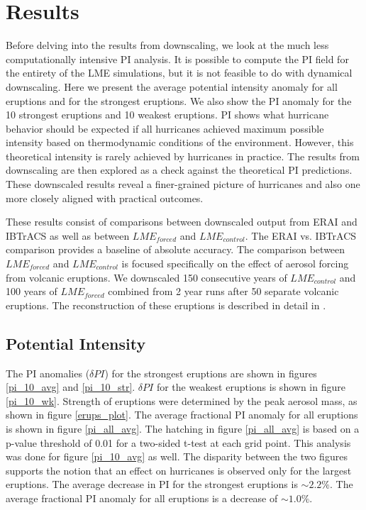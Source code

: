 \documentclass[smallextended]{svjour3}       %
\begin{document}
\section{Results}
\label{results}
Before delving into the results from downscaling, we look at the much less computationally intensive PI analysis. It is possible to compute the PI field for the entirety of the LME simulations, but it is not feasible to do with dynamical downscaling. Here we present the average potential intensity anomaly for all eruptions and for the strongest eruptions. We also show the PI anomaly for the 10 strongest eruptions and 10 weakest eruptions. PI shows what hurricane behavior should be expected if all hurricanes achieved maximum possible intensity based on thermodynamic conditions of the environment. However, this theoretical intensity is rarely achieved by hurricanes in practice. The results from downscaling are then explored as a check against the theoretical PI predictions. These downscaled results reveal a finer-grained picture of hurricanes and also one more closely aligned with practical outcomes.     
\par
These results consist of comparisons between downscaled output from ERAI and IBTrACS as well as between $LME_{forced}$ and $LME_{control}$. The ERAI vs. IBTrACS comparison provides a baseline of absolute accuracy. The comparison between $LME_{forced}$ and $LME_{control}$ is focused specifically on the effect of aerosol forcing from volcanic eruptions. We downscaled 150 consecutive years of $LME_{control}$ and 100 years of $LME_{forced}$ combined from 2 year runs after 50 separate volcanic eruptions. The reconstruction of these eruptions is described in detail in \cite{erups_recon}.    

\subsection{Potential Intensity}
The PI anomalies ($\delta PI$) for the strongest eruptions are shown in figures \ref{pi_10_avg} and \ref{pi_10_str}. $\delta PI$ for the weakest eruptions is shown in figure \ref{pi_10_wk}. Strength of eruptions were determined by the peak aerosol mass, as shown in figure \ref{erups_plot}. The average fractional PI anomaly for all eruptions is shown in figure \ref{pi_all_avg}. The hatching in figure \ref{pi_all_avg} is based on a p-value threshold of 0.01 for a two-sided t-test at each grid point. This analysis was done for figure \ref{pi_10_avg} as well. The disparity between the two figures supports the notion that an effect on hurricanes is observed only for the largest eruptions. The average decrease in PI for the strongest eruptions is ${\sim}2.2\%$. The average fractional PI anomaly for all eruptions is a decrease of ${\sim}1.0\%$.   
\end{document}
